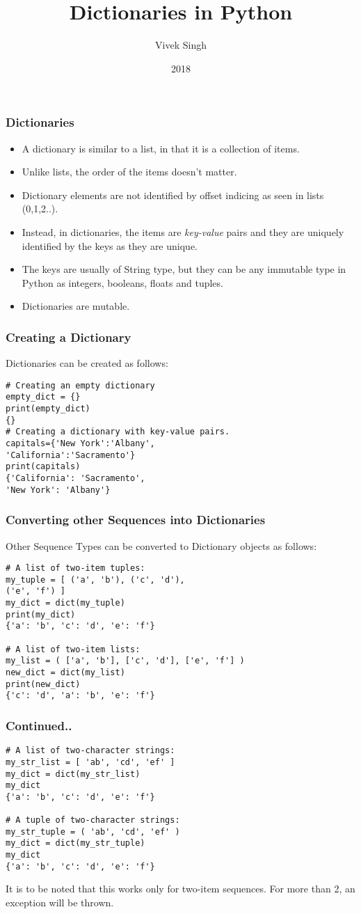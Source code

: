 \documentclass{beamer}
\title{Dictionaries in Python}
\author{Vivek Singh}
\institute{Information Systems Decision Sciences (ISDS)\\
MUMA College of Business\\
University of South Florida \\
Tampa, Florida}
\date{2018}
\begin{document}
\frame{\titlepage}

\begin{frame}
\frametitle{Dictionaries}
\begin{itemize}
\item A dictionary is similar to a list, in that it is a collection of items.
\item Unlike lists, the order of the items doesn't matter.
\item Dictionary elements are not identified by offset indicing as seen in lists (0,1,2..).
\item Instead, in dictionaries, the items are \textit{key-value} pairs and they are uniquely identified by the keys as they are unique. 
\item The keys are usually of String type, but they can be any immutable type in Python as integers, booleans, floats and tuples.
\item Dictionaries are mutable.
\end{itemize}
\end{frame}

\begin{frame}[fragile]
\frametitle{Creating a Dictionary}
Dictionaries can be created as follows:
\begin{lstlisting}
# Creating an empty dictionary
empty_dict = {}
print(empty_dict)
{}
# Creating a dictionary with key-value pairs.
capitals={'New York':'Albany',
'California':'Sacramento'}
print(capitals)
{'California': 'Sacramento', 
'New York': 'Albany'}
\end{lstlisting}
\end{frame}

\begin{frame}[fragile]
\frametitle{Converting other Sequences into Dictionaries}
Other Sequence Types can be converted to Dictionary objects as follows:
\begin{lstlisting}
# A list of two-item tuples:
my_tuple = [ ('a', 'b'), ('c', 'd'), 
('e', 'f') ]
my_dict = dict(my_tuple)
print(my_dict)
{'a': 'b', 'c': 'd', 'e': 'f'}

# A list of two-item lists:
my_list = ( ['a', 'b'], ['c', 'd'], ['e', 'f'] )
new_dict = dict(my_list)
print(new_dict)
{'c': 'd', 'a': 'b', 'e': 'f'}
\end{lstlisting}
\end{frame}

\begin{frame}[fragile]
\frametitle{Continued..}
\begin{lstlisting}
# A list of two-character strings:
my_str_list = [ 'ab', 'cd', 'ef' ]
my_dict = dict(my_str_list)
my_dict
{'a': 'b', 'c': 'd', 'e': 'f'}

# A tuple of two-character strings:
my_str_tuple = ( 'ab', 'cd', 'ef' )
my_dict = dict(my_str_tuple)
my_dict
{'a': 'b', 'c': 'd', 'e': 'f'}
\end{lstlisting}
It is to be noted that this works only for two-item sequences. For more than 2, an exception will be thrown.
\end{frame}
\end{document}
